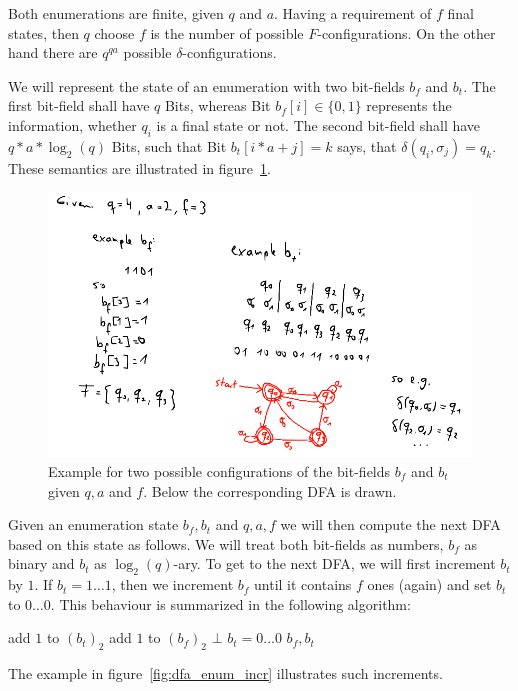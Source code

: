 
Both enumerations are finite, given $q$ and $a$. Having a requirement of $f$ final states, then $q$ choose $f$ is the number of possible $F$-configurations. On the other hand there are $q^{qa}$ possible $\delta$-configurations. 


We will represent the state of an enumeration with two bit-fields $b_f$ and $b_t$. The first bit-field shall have $q$ Bits, whereas Bit $b_f[i] \in \{0,1\}$ represents the information, whether $q_i$ is a final state or not. The second bit-field shall have $q*a*\log_2(q)$ Bits, such that Bit $b_t[i * a + j] = k$ says, that $\delta(q_i, \sigma_j) = q_k$. These semantics are illustrated in figure~\ref{fig:dfa_enum_bit_fields}.


\begin{figure}
	\includegraphics[width=\linewidth]{images/dfa_enum_bit_fields.png}
	\caption{Example for two possible configurations of the bit-fields $b_f$ and $b_t$ given $q, a$ and $f$. Below the corresponding DFA is drawn.}
	\label{fig:dfa_enum_bit_fields}
\end{figure}


Given an enumeration state $b_f, b_t$ and $q, a, f$ we will then compute the next DFA based on this state as follows. We will treat both bit-fields as numbers, $b_f$ as binary and $b_t$ as $\log_2(q)$-ary. To get to the next DFA, we will first increment $b_t$ by $1$. If $b_t = 1 \ldots 1$, then we increment $b_f$ until it contains $f$ ones (again) and set $b_t$ to $0 \ldots 0$. This behaviour is summarized in the following algorithm: 
\vspace{0.2cm}
\begin{algorithmic}[1]
	\State add $1$ to $(b_t)_2$
			\State add $1$ to $(b_f)_2$
				\State \Return $\bot$
			\EndIf
		\State $b_t = 0 \ldots 0$
		\EndWhile
	\EndIf
	\State \Return $b_f, b_t$
	\EndFunction
\end{algorithmic}
\vspace{0.2cm}
The example in figure~\ref{fig:dfa_enum_incr} illustrates such increments.

